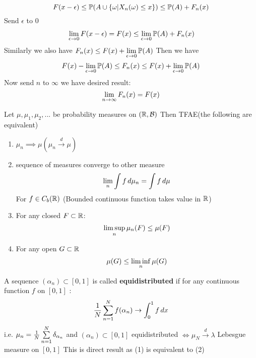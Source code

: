 \begin{equation*}
    F(x-\epsilon) \leq \mathbb{P}(A\cup \{\omega|X_n(\omega) \leq x\}) \leq \mathbb{P}(A)+F_n(x)
\end{equation*} Send $\epsilon$ to 0
\begin{align*}
    &\lim\limits_{\epsilon \rightarrow 0}F(x-\epsilon) =  F(x) \leq \lim\limits_{\epsilon \rightarrow 0}\mathbb{P}(A) + F_n(x) \\
\end{align*}Similarly we also have $F_n(x) \leq F(x) + \lim\limits_{\epsilon \rightarrow 0}\mathbb{P}(A)$ Then we have
\begin{equation*}
   F(x) - \lim\limits_{\epsilon \rightarrow 0}\mathbb{P}(A) \leq F_n(x) \leq F(x) + \lim\limits_{\epsilon \rightarrow 0}\mathbb{P}(A)
\end{equation*}Now send $n$ to $\infty$ we have desired result:
\begin{equation*}
    \lim\limits_{n \rightarrow \infty} F_n(x) = F(x)
\end{equation*}


\newpage
\begin{thm}
\label{Portmanteau}
Let $\mu, \mu_1, \mu_2, ...$ be probability measures on $(\mathbb{R}, \mathcal{B})$ Then TFAE(the following are equivalent)
\begin{enumerate}
    \item $\mu_n \implies \mu (\mu_n \xrightarrow{d} \mu)$
    \item sequence of measures converge to other measure \begin{equation*}
        \lim\limits_{n}\int f \mathop{}\!d\mu_n = \int f \mathop{}\!d\mu
    \end{equation*} For $f\in C_b(\mathbb{R})$ (Bounded continuous function takes value in $\mathbb{R}$)
    \item For any closed $F\subset \mathbb{R}$:
    \begin{equation*}
        \limsup\limits_{n} \mu_n(F) \leq \mu(F)
    \end{equation*}
    \item For any open $G\subset\mathbb{R}$
    \begin{equation*}
        \mu(G) \leq \liminf\limits_{n}\mu(G)
    \end{equation*}
\end{enumerate}
\end{thm}
\begin{rem}
A sequence $(\alpha_n) \subset [0,1]$ is called \textbf{equidistributed} if for any continuous function $f$ on $[0,1]$ :
\begin{equation*}
    \frac{1}{N}\sum\limits_{n=1}^N f(\alpha_n) \rightarrow \int_0^1 f \mathop{}\!d x 
\end{equation*} i.e. $\mu_n = \frac{1}{N}\sum\limits_{n=1}^N \delta_{\alpha_n}$ and $(\alpha_n)\subset [0,1]$ equidistributed $\Longleftrightarrow \mu_N\xrightarrow{d}\lambda$ Lebesgue measure on $[0,1]$ This is direct result as (1) is equivalent to (2)
\end{rem}
